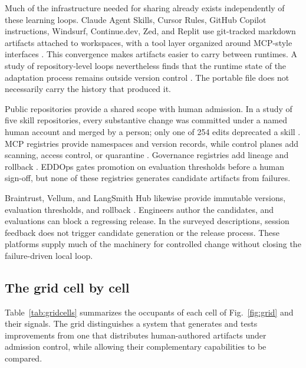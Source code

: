 Much of the infrastructure needed for sharing already exists independently of these learning loops. Claude Agent Skills, Cursor Rules, GitHub Copilot instructions, Windsurf, Continue.dev, Zed, and Replit use git-tracked markdown artifacts attached to workspaces, with a tool layer organized around MCP-style interfaces \citep{galster2026harnessconfig, barbaste2026harnessengineering}. This convergence makes artifacts easier to carry between runtimes. A study of repository-level loops nevertheless finds that the runtime state of the adaptation process remains outside version control \citep{lulla2026loopengineering}. The portable file does not necessarily carry the history that produced it.

Public repositories provide a shared scope with human admission. In a study of five skill repositories, every substantive change was committed under a named human account and merged by a person; only one of 254 edits deprecated a skill \citep{shen2026whomaintains}. MCP registries provide namespaces and version records, while control planes add scanning, access control, or quarantine \citep{agenticcommunity2026mcpgateway, microsoft2026apicentermcp, truefoundry2026mcpgateway}. Governance registries add lineage and rollback \citep{kang2026registry, quessadavial2026acm, qin2026governed}. EDDOps gates promotion on evaluation thresholds before a human sign-off, but none of these registries generates candidate artifacts from failures.

Braintrust, Vellum, and LangSmith Hub likewise provide immutable versions, evaluation thresholds, and rollback \citep{braintrust2026docs, vellum2026docs, langsmith2026hub}. Engineers author the candidates, and evaluations can block a regressing release. In the surveyed descriptions, session feedback does not trigger candidate generation or the release process. These platforms supply much of the machinery for controlled change without closing the failure-driven local loop.

\subsection{The grid cell by cell}\label{the-grid-cell-by-cell}

Table~\ref{tab:gridcells} summarizes the occupants of each cell of Fig.~\ref{fig:grid} and their signals. The grid distinguishes a system that generates and tests improvements from one that distributes human-authored artifacts under admission control, while allowing their complementary capabilities to be compared.

